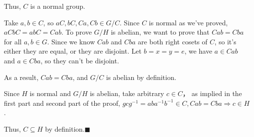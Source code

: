 \documentclass[11pt]{article}
\begin{document}
		Thus, $C$ is a normal group.
		
		Take $a, b \in C$, so $aC, bC, Ca, Cb \in  G / C$. Since $C$ is normal as we've proved, $aCbC = abC = Cab$. To prove $G / H$ is abelian, we want to prove that $Cab = Cba$ for all $a, b \in G$. Since we know $Cab$ and $Cba$ are both right cosets of $C$, so it's either they are equal, or they are disjoint. Let $b = x = y = e$, we have $a \in Cab$ and $a \in Cba$, so they can't be disjoint.
		
		 As a result, $Cab = Cba$, and $G / C$ is abelian by definition.
		 
		 Since $H$ is normal and $G /H$ is abelian, take arbitrary $c \in C$， as implied in the first part and second part of the proof, $gcg^{-1} = aba^{-1}b^{-1} \in C, Cab = Cba \Rightarrow c \in H$. 
		 
		 Thus, $C \subseteq H$ by definition.$\blacksquare$ 
		 
		 
		
\end{document}

